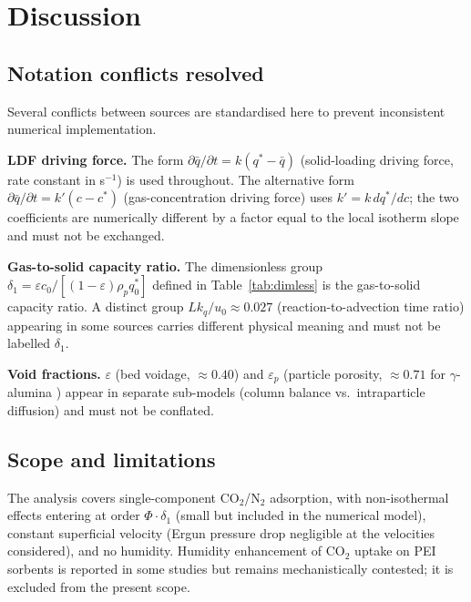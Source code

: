\documentclass[a4paper]{amsart}
\theoremstyle{definition}
\begin{document}
\section{Discussion}
\label{sec:resolution}

\subsection{Notation conflicts resolved}

Several conflicts between sources are standardised here to prevent
inconsistent numerical implementation.

\textbf{LDF driving force.}
The form $\partial\bar{q}/\partial t = k(q^*-\bar{q})$
(solid-loading driving force, rate constant in s$^{-1}$) is used throughout.
The alternative form $\partial\bar{q}/\partial t = k'(c-c^*)$
(gas-concentration driving force) uses $k'=k\,dq^*/dc$; the two coefficients
are numerically different by a factor equal to the local isotherm slope and
must not be exchanged.

\textbf{Gas-to-solid capacity ratio.}
The dimensionless group $\delta_1 = \varepsilon c_0/[(1-\varepsilon)\rho_p q_0^*]$
defined in Table~\ref{tab:dimless} is the gas-to-solid capacity ratio.
A distinct group $Lk_q/u_0\approx0.027$ (reaction-to-advection time ratio)
appearing in some sources carries different physical meaning and must not
be labelled $\delta_1$.

\textbf{Void fractions.}
$\varepsilon$ (bed voidage, $\approx0.40$) and $\varepsilon_p$ (particle porosity,
$\approx0.71$ for $\gamma$-alumina \cite{Stampi2024}) appear in separate
sub-models (column balance vs.\ intraparticle diffusion) and must not
be conflated.

\subsection{Scope and limitations}

The analysis covers single-component CO$_2$/N$_2$ adsorption, with
non-isothermal effects entering at order $\Phi\cdot\delta_1$ (small but
included in the numerical model), constant superficial velocity (Ergun
pressure drop negligible at the velocities considered), and no humidity.
Humidity enhancement of CO$_2$ uptake on PEI sorbents is reported in some
studies but remains mechanistically contested; it is excluded from the
present scope.
\end{document}
